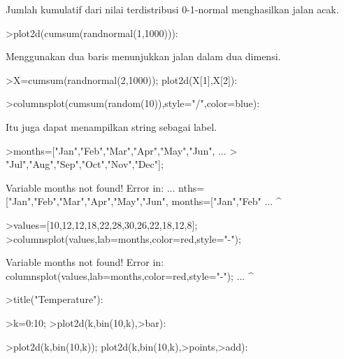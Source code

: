 \documentclass[a4paper,10pt]{article}
\begin{document}
\begin{eulernotebook}
\begin{eulercomment}
\begin{eulercomment}
\begin{eulercomment}
\begin{eulercomment}
\begin{eulercomment}
\begin{eulercomment}
\begin{eulercomment}
Jumlah kumulatif dari nilai terdistribusi 0-1-normal menghasilkan
jalan acak.
\end{eulercomment}
\begin{eulerprompt}
>plot2d(cumsum(randnormal(1,1000))):
\end{eulerprompt}
\begin{eulercomment}
Menggunakan dua baris menunjukkan jalan dalam dua dimensi.
\end{eulercomment}
\begin{eulerprompt}
>X=cumsum(randnormal(2,1000)); plot2d(X[1],X[2]):
\end{eulerprompt}
\begin{eulerprompt}
>columnsplot(cumsum(random(10)),style="/",color=blue):
\end{eulerprompt}
\begin{eulercomment}
Itu juga dapat menampilkan string sebagai label.
\end{eulercomment}
\begin{eulerprompt}
>months=["Jan","Feb","Mar","Apr","May","Jun", ...
>  "Jul","Aug","Sep","Oct","Nov","Dec"];
\end{eulerprompt}
\begin{euleroutput}
  Variable months not found!
  Error in:
  ... nths=["Jan","Feb","Mar","Apr","May","Jun", months=["Jan","Feb" ...
                                                       ^
\end{euleroutput}
\begin{eulerprompt}
>values=[10,12,12,18,22,28,30,26,22,18,12,8];
>columnsplot(values,lab=months,color=red,style="-");
\end{eulerprompt}
\begin{euleroutput}
  Variable months not found!
  Error in:
  columnsplot(values,lab=months,color=red,style="-"); ...
                               ^
\end{euleroutput}
\begin{eulerprompt}
>title("Temperature"):
\end{eulerprompt}
\begin{eulerprompt}
>k=0:10;
>plot2d(k,bin(10,k),>bar):
\end{eulerprompt}
\begin{eulerprompt}
>plot2d(k,bin(10,k)); plot2d(k,bin(10,k),>points,>add):
\end{eulerprompt}

\end{eulercomment}
\end{eulercomment}
\end{eulercomment}
\end{eulercomment}
\end{eulercomment}
\end{eulercomment}
\end{eulernotebook}
\end{document}
